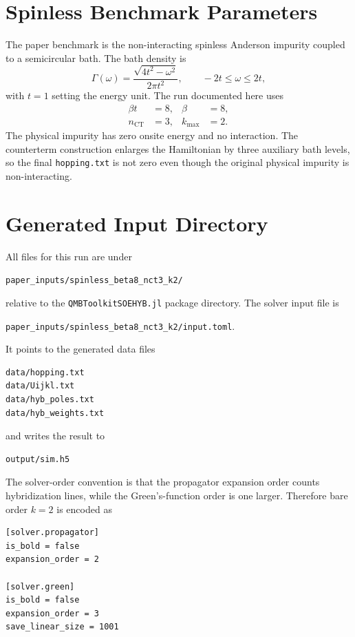\documentclass[11pt,a4paper]{article}
\theoremstyle{definition}
\theoremstyle{plain}
\begin{document}
\section{Spinless Benchmark Parameters}

The paper benchmark is the non-interacting spinless Anderson impurity coupled
to a semicircular bath.  The bath density is
\begin{equation}
  \Gamma(\omega)=\frac{\sqrt{4t^2-\omega^2}}{2\pi t^2},
  \qquad -2t \leq \omega \leq 2t,
\end{equation}
with $t=1$ setting the energy unit.  The run documented here uses
\begin{align*}
  \beta t &= 8, & \beta &= 8,\\
  n_{\mathrm{CT}} &= 3, & k_{\max} &= 2.
\end{align*}
The physical impurity has zero onsite energy and no interaction.  The
counterterm construction enlarges the Hamiltonian by three auxiliary bath
levels, so the final \texttt{hopping.txt} is not zero even though the original
physical impurity is non-interacting.

\section{Generated Input Directory}

All files for this run are under
\begin{center}
\texttt{paper\_inputs/spinless\_beta8\_nct3\_k2/}
\end{center}
relative to the \texttt{QMBToolkitSOEHYB.jl} package directory.  The solver
input file is
\begin{center}
\texttt{paper\_inputs/spinless\_beta8\_nct3\_k2/input.toml}.
\end{center}
It points to the generated data files
\begin{verbatim}
data/hopping.txt
data/Uijkl.txt
data/hyb_poles.txt
data/hyb_weights.txt
\end{verbatim}
and writes the result to
\begin{verbatim}
output/sim.h5
\end{verbatim}

The solver-order convention is that the propagator expansion order counts
hybridization lines, while the Green's-function order is one larger.  Therefore
bare order $k=2$ is encoded as
\begin{verbatim}
[solver.propagator]
is_bold = false
expansion_order = 2

[solver.green]
is_bold = false
expansion_order = 3
save_linear_size = 1001
\end{verbatim}
\end{document}
